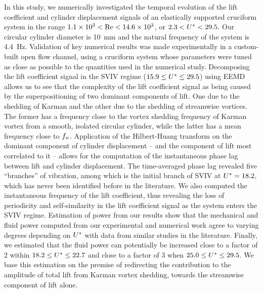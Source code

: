 \documentclass[oneside]{utmthesis}
\begin{document}
In this study, we numerically investigated the temporal evolution of the lift coefficient and cylinder displacement signals of an elastically supported cruciform system in the range $1.1 \times 10^{3} < \text{Re} < 14.6 \times 10^{3}$, or $2.3 < U^{*} < 29.5$. Our circular cylinder diameter is \SI{10}{\milli\metre} and the natural frequency of the system is \SI{4.4}{\hertz}. Validation of key numerical results was made experimentally in a custom-built open flow channel, using a cruciform system whose parameters were tuned as close as possible to the quantities used in the numerical study. Decomposing the lift coefficient signal in the SVIV regime ($15.9 \leq U^{*} \leq 29.5$) using EEMD allows us to see that the complexity of the lift coefficient signal as being caused by the superpositioning of two dominant components of lift. One due to the shedding of Karman and the other due to the shedding of streamwise vortices. The former has a frequency close to the vortex shedding frequency of Karman vortex from a smooth, isolated circular cylinder, while the latter has a mean frequency close to $f_{n}$. Application of the Hilbert-Huang transform on the dominant component of cylinder displacement -- and the component of lift most correlated to it -- allows for the computation of the instantaneous phase lag between lift and cylinder displacement. The time-averaged phase lag revealed five ``branches'' of vibration, among which is the initial branch of SVIV at $U^{*} = 18.2$, which has never been identified before in the literature. We also computed the instantaneous frequency of the lift coefficient, thus revealing the loss of periodicity and self-similarity in the lift coefficient signal as the system enters the SVIV regime. Estimation of power from our results show that the \rms{} mechanical and fluid power computed from our experimental and numerical work agree to varying degrees depending on $U^{*}$ with data from similar studies in the literature. Finally, we estimated that the \rms{} fluid power can potentially be increased close to a factor of 2 within $18.2 \leq U^{*} \leq 22.7$ and close to a factor of 3 when $25.0 \leq U^{*} \leq 29.5$. We base this estimation on the premise of redirecting the contribution to the \rms{} amplitude of total lift from Karman vortex shedding, towards the streamwise component of lift alone.
\end{document}
